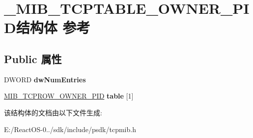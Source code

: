 \hypertarget{struct___m_i_b___t_c_p_t_a_b_l_e___o_w_n_e_r___p_i_d}{}\section{\+\_\+\+M\+I\+B\+\_\+\+T\+C\+P\+T\+A\+B\+L\+E\+\_\+\+O\+W\+N\+E\+R\+\_\+\+P\+I\+D结构体 参考}
\label{struct___m_i_b___t_c_p_t_a_b_l_e___o_w_n_e_r___p_i_d}
\subsection*{Public 属性}
\begin{DoxyCompactItemize}
\item 
\mbox{\label{struct___m_i_b___t_c_p_t_a_b_l_e___o_w_n_e_r___p_i_d_a75355f04ffc8440090c7f294ce98b065}} 
D\+W\+O\+RD {\bfseries dw\+Num\+Entries}
\item 
\mbox{\label{struct___m_i_b___t_c_p_t_a_b_l_e___o_w_n_e_r___p_i_d_ab0bdcb768751979e53a05bee8689cad1}} 
\hyperlink{struct___m_i_b___t_c_p_r_o_w___o_w_n_e_r___p_i_d}{M\+I\+B\+\_\+\+T\+C\+P\+R\+O\+W\+\_\+\+O\+W\+N\+E\+R\+\_\+\+P\+ID} {\bfseries table} \mbox{[}1\mbox{]}
\end{DoxyCompactItemize}


该结构体的文档由以下文件生成\+:\begin{DoxyCompactItemize}
\item 
E\+:/\+React\+O\+S-\/0../sdk/include/psdk/tcpmib.\+h\end{DoxyCompactItemize}

